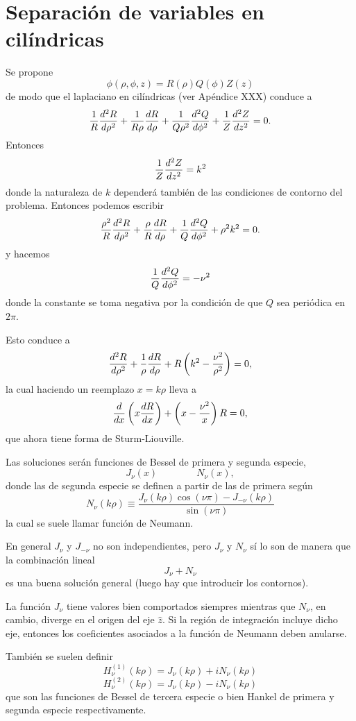 \documentclass[10pt,oneside]{CBFT_book}
\begin{document}
\section{Separación de variables en cilíndricas}

Se propone
\[
	\phi(\rho,\phi,z) = R(\rho) Q(\phi) Z(z)
\]
de modo que el laplaciano en cilíndricas (ver Apéndice XXX) conduce a
\[
	\frac{1}{R} \dtot[2]{R}{\rho} + \frac{1}{R\rho} \dtot{R}{\rho} + \frac{1}{Q\rho^2} \dtot[2]{Q}{\phi} 
				+ \frac{1}{Z} \dtot[2]{Z}{z} = 0.
\]
Entonces
\[
	\frac{1}{Z} \dtot[2]{Z}{z} = k^2
\]
donde la naturaleza de $k$ dependerá también de las condiciones de contorno
del problema.
Entonces podemos escribir
\[
	\frac{\rho^2}{R} \dtot[2]{R}{\rho} + 
	\frac{\rho}{R} \dtot{R}{\rho} + 
	\frac{1}{Q} \dtot[2]{Q}{\phi} 
	+ \rho^2 k^2 = 0.
\]
y hacemos
\[
	\frac{1}{Q} \dtot[2]{Q}{\phi} = -\nu^2
\]
donde la constante se toma negativa por la condición de que $Q$ sea periódica
en $2\pi$.

Esto conduce a 
\[
	\dtot[2]{R}{\rho} + \frac{1}{\rho} \dtot{R}{\rho} +
	R \left( k^2 -  \frac{\nu^2}{\rho^2} \right) = 0,
\]
la cual haciendo un reemplazo $x = k \rho$ lleva a
\[
	\dtot{}{x}\left( x \dtot{R}{x} \right) +
	\left( x -  \frac{\nu^2}{x} \right) R = 0,
\]
que ahora tiene forma de Sturm-Liouville.

Las soluciones serán funciones de Bessel de primera y segunda especie,
\[
	J_\nu (x) \qquad \qquad N_\nu(x), 
\]
donde las de segunda especie se definen a partir de las de primera según
\[
	N_\nu(k\rho) \equiv \frac{ J_\nu(k\rho) \cos(\nu\pi) - J_{-\nu}(k\rho)}{\sin(\nu\pi)}
\]
la cual se suele llamar función de Neumann.

En general $J_{\nu}$ y $J_{-\nu}$ no son independientes, pero $J_{\nu}$ y $N_{\nu}$ sí lo
son de manera que la combinación lineal
\[
	J_{\nu} + N_{\nu}
\]
es una buena solución general (luego hay que introducir los contornos).

La función $J_{\nu}$ tiene valores bien comportados siempres mientras que $N_{\nu}$, en cambio,
diverge en el origen del eje $\hat{z}$. Si la región de integración incluye dicho eje, entonces
los coeficientes asociados a la función de Neumann deben anularse.

También se suelen definir
\[
	H^{(1)}_\nu(k\rho) = J_\nu(k\rho) + i N_\nu(k\rho)
\]
\[
	H^{(2)}_\nu(k\rho) = J_\nu(k\rho) - i N_\nu(k\rho)
\]
que son las funciones de Bessel de tercera especie o bien Hankel de primera y segunda especie respectivamente.
\end{document}
